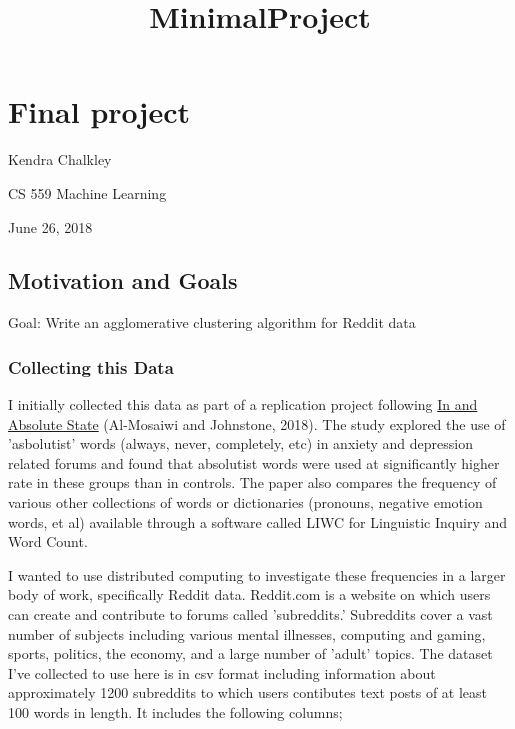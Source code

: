 \documentclass[11pt]{article}
\title{MinimalProject}
\begin{document}
    
    
    \maketitle
    
    

    
    \section{Final project}\label{final-project}

Kendra Chalkley

CS 559 Machine Learning

June 26, 2018

\subsection{Motivation and Goals}\label{motivation-and-goals}

Goal: Write an agglomerative clustering algorithm for Reddit data

\subsubsection{Collecting this Data}\label{collecting-this-data}

I initially collected this data as part of a replication project
following
\href{http://journals.sagepub.com/doi/abs/10.1177/2167702617747074}{In
and Absolute State} (Al-Mosaiwi and Johnstone, 2018). The study explored
the use of 'asbolutist' words (always, never, completely, etc) in
anxiety and depression related forums and found that absolutist words
were used at significantly higher rate in these groups than in controls.
The paper also compares the frequency of various other collections of
words or dictionaries (pronouns, negative emotion words, et al)
available through a software called LIWC for Linguistic Inquiry and Word
Count.

I wanted to use distributed computing to investigate these frequencies
in a larger body of work, specifically Reddit data. Reddit.com is a
website on which users can create and contribute to forums called
'subreddits.' Subreddits cover a vast number of subjects including
various mental illnesses, computing and gaming, sports, politics, the
economy, and a large number of 'adult' topics. The dataset I've
collected to use here is in csv format including information about
approximately 1200 subreddits to which users contibutes text posts of at
least 100 words in length. It includes the following columns;
\end{document}
